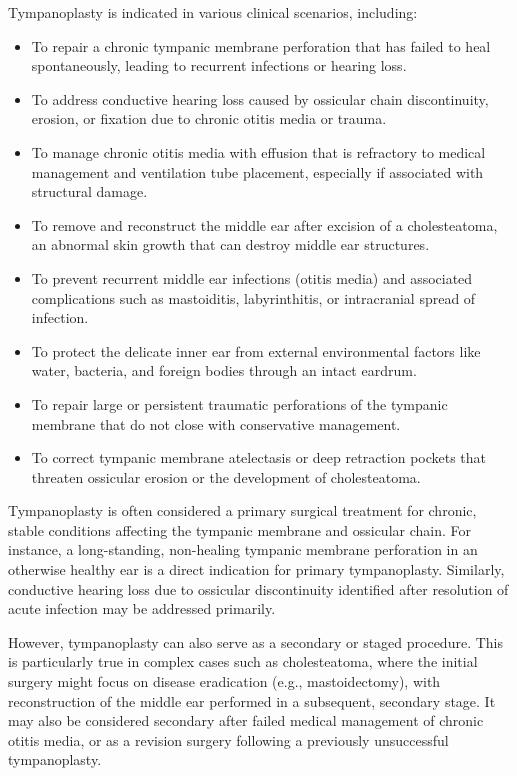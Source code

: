 Tympanoplasty is indicated in various clinical scenarios, including:

\begin{itemize}
  \item To repair a chronic tympanic membrane perforation that has failed to heal spontaneously, leading to recurrent infections or hearing loss.
  \item To address conductive hearing loss caused by ossicular chain discontinuity, erosion, or fixation due to chronic otitis media or trauma.
  \item To manage chronic otitis media with effusion that is refractory to medical management and ventilation tube placement, especially if associated with structural damage.
  \item To remove and reconstruct the middle ear after excision of a cholesteatoma, an abnormal skin growth that can destroy middle ear structures.
  \item To prevent recurrent middle ear infections (otitis media) and associated complications such as mastoiditis, labyrinthitis, or intracranial spread of infection.
  \item To protect the delicate inner ear from external environmental factors like water, bacteria, and foreign bodies through an intact eardrum.
  \item To repair large or persistent traumatic perforations of the tympanic membrane that do not close with conservative management.
  \item To correct tympanic membrane atelectasis or deep retraction pockets that threaten ossicular erosion or the development of cholesteatoma.
\end{itemize}

Tympanoplasty is often considered a primary surgical treatment for chronic, stable conditions affecting the tympanic membrane and ossicular chain. For instance, a long-standing, non-healing tympanic membrane perforation in an otherwise healthy ear is a direct indication for primary tympanoplasty. Similarly, conductive hearing loss due to ossicular discontinuity identified after resolution of acute infection may be addressed primarily. 

However, tympanoplasty can also serve as a secondary or staged procedure. This is particularly true in complex cases such as cholesteatoma, where the initial surgery might focus on disease eradication (e.g., mastoidectomy), with reconstruction of the middle ear performed in a subsequent, secondary stage. It may also be considered secondary after failed medical management of chronic otitis media, or as a revision surgery following a previously unsuccessful tympanoplasty.

